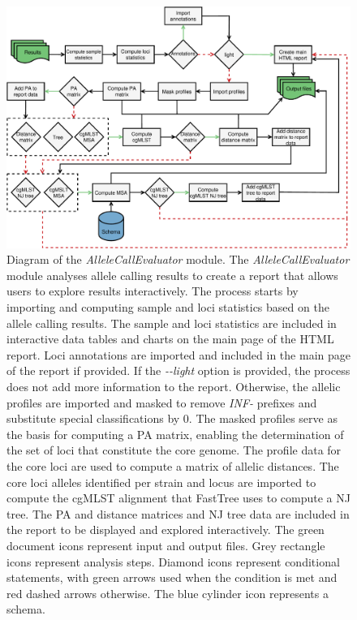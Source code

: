 \newpage
\begin{figure}[h!]
    \centering
    \includegraphics[angle=0,width=\textwidth]{figures/chapter 2/FigureS22.pdf}
    \caption{Diagram of the \textit{AlleleCallEvaluator} module. The \textit{AlleleCallEvaluator} module analyses allele calling results to create a report that allows users to explore results interactively. The process starts by importing and computing sample and loci statistics based on the allele calling results. The sample and loci statistics are included in interactive data tables and charts on the main page of the \ac{HTML} report. Loci annotations are imported and included in the main page of the report if provided. If the \textit{-{}-light} option is provided, the process does not add more information to the report. Otherwise, the allelic profiles are imported and masked to remove \textit{INF-} prefixes and substitute special classifications by 0. The masked profiles serve as the basis for computing a \ac{PA} matrix, enabling the determination of the set of loci that constitute the core genome. The profile data for the core loci are used to compute a matrix of allelic distances. The core loci alleles identified per strain and locus are imported to compute the \ac{cgMLST} alignment that FastTree uses to compute a \ac{NJ} tree. The \ac{PA} and distance matrices and \ac{NJ} tree data are included in the report to be displayed and explored interactively. The green document icons represent input and output files. Grey rectangle icons represent analysis steps. Diamond icons represent conditional statements, with green arrows used when the condition is met and red dashed arrows otherwise. The blue cylinder icon represents a schema.}
    \label{fig:chap2_figureS22}
\end{figure}


